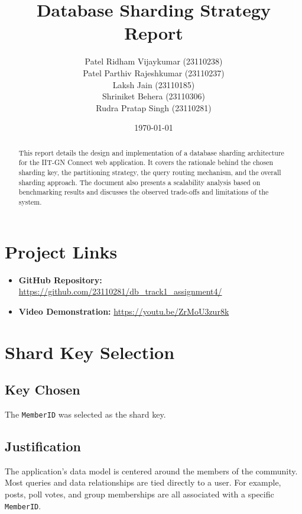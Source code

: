 \documentclass{article}
\title{Database Sharding Strategy Report}
\author{
    Patel Ridham Vijaykumar (23110238) \\
    Patel Parthiv Rajeshkumar (23110237) \\
    Laksh Jain (23110185) \\
    Shriniket Behera (23110306) \\
    Rudra Pratap Singh (23110281)
}
\date{\today}
\begin{document}
\maketitle

\begin{abstract}
This report details the design and implementation of a database sharding architecture for the IIT-GN Connect web application. It covers the rationale behind the chosen sharding key, the partitioning strategy, the query routing mechanism, and the overall sharding approach. The document also presents a scalability analysis based on benchmarking results and discusses the observed trade-offs and limitations of the system.
\end{abstract}

\section*{Project Links}
\begin{itemize}
    \item \textbf{GitHub Repository:} \href{https://github.com/23110281/db_track1_assignment4/}{https://github.com/23110281/db\_track1\_assignment4/}
    \item \textbf{Video Demonstration:} \href{https://youtu.be/ZrMoU3zur8k}{https://youtu.be/ZrMoU3zur8k}
\end{itemize}

\section{Shard Key Selection}
\subsection{Key Chosen}
The \texttt{MemberID} was selected as the shard key.

\subsection{Justification}
The application's data model is centered around the members of the community. Most queries and data relationships are tied directly to a user. For example, posts, poll votes, and group memberships are all associated with a specific \texttt{MemberID}.
\end{document}
